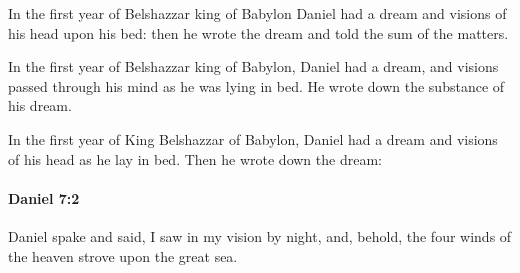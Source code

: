 			\begin{versebox}
					\item[BHS] 
					\item[LXX] 
					\item[ASV] In the first year of Belshazzar king of Babylon Daniel had a dream and visions of his head upon his bed: then he wrote the dream and told the sum of the matters.
					\item[NIV] In the first year of Belshazzar king of Babylon, Daniel had a dream, and visions passed through his mind as he was lying in bed. He wrote down the substance of his dream.
					\item[NRSV] In the first year of King Belshazzar of Babylon, Daniel had a dream and visions of his head as he lay in bed. Then he wrote down the dream:
			\end{versebox}

		\paragraph{Daniel 7:2} %
			\label{DANIEL-7-2}

			Daniel spake and said, I saw in my vision by night, and, behold, the four winds of the heaven strove upon the great sea.

